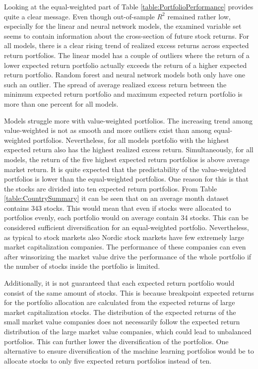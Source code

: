 \documentclass[12pt]{article}
\begin{document}
Looking at the equal-weighted part of Table \ref{table:PortfolioPerformance} provides quite a clear message. Even though out-of-sample $R^2$ remained rather low, especially for the linear and neural network models, the examined variable set seems to contain information about the cross-section of future stock returns. For all models, there is a clear rising trend of realized excess returns across expected return portfolios. The linear model has a couple of outliers where the return of a lower expected return portfolio actually exceeds the return of a higher expected return portfolio. Random forest and neural network models both only have one such an outlier. The spread of average realized excess return between the minimum expected return portfolio and maximum expected return portfolio is more than one percent for all models.  \par

Models struggle more with value-weighted portfolios. The increasing trend among value-weighted is not as smooth and more outliers exist than among equal-weighted portfolios. Nevertheless, for all models portfolio with the highest expected return also has the highest realized excess return. Simultaneously, for all models, the return of the five highest expected return portfolios is above average market return. It is quite expected that the predictability of the value-weighted portfolios is lower than the equal-weighted portfolios. One reason for this is that the stocks are divided into ten expected return portfolios. From Table \ref{table:CountrySummary} it can be seen that on an average month dataset contains 343 stocks. This would mean that even if stocks were allocated to portfolios evenly, each portfolio would on average contain 34 stocks. This can be considered sufficient diversification for an equal-weighted portfolio. Nevertheless, as typical to stock markets also Nordic stock markets have few extremely large market capitalization companies. The performance of these companies can even after winsorizing the market value drive the performance of the whole portfolio if the number of stocks inside the portfolio is limited. \par

Additionally, it is not guaranteed that each expected return portfolio would consist of the same amount of stocks. This is because breakpoint expected returns for the portfolio allocation are calculated from the expected returns of large market capitalization stocks. The distribution of the expected returns of the small market value companies does not necessarily follow the expected return distribution of the large market value companies, which could lead to unbalanced portfolios. This can further lower the diversification of the portfolios. One alternative to ensure diversification of the machine learning portfolios would be to allocate stocks to only five expected return portfolios instead of ten. \par
\end{document}
